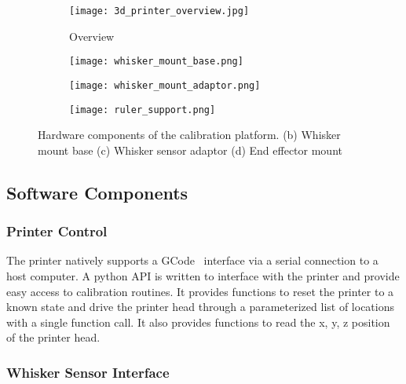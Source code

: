 \documentclass[runningheads]{llncs}
\begin{document}
\begin{figure}
    \begin{subfigure}{.245\columnwidth}
        \centering
        \texttt{[image: 3d\_printer\_overview.jpg]}
        \caption{Overview}
        \label{fig:calibration_rig_overview}
    \end{subfigure}
    \begin{subfigure}{.245\columnwidth}
    \centering
    \texttt{[image: whisker\_mount\_base.png]}
        \caption{}
        \label{fig:whisker_mount_base}
    \end{subfigure}
    \begin{subfigure}{.245\columnwidth}
        \centering
        \texttt{[image: whisker\_mount\_adaptor.png]}
        \caption{}
        \label{fig:whisker_mount_adaptor}
    \end{subfigure}
    \begin{subfigure}{.245\columnwidth}
        \centering
        \texttt{[image: ruler\_support.png]}
        \caption{}
        \label{fig:beam_monunt}
    \end{subfigure}
    \caption{Hardware components of the calibration platform. (b) Whisker mount base (c) Whisker sensor adaptor (d) End effector mount}
    \label{fig:calibration_rig}
\end{figure}

\subsection{Software Components}

\subsubsection{Printer Control}

The printer natively supports a GCode~\cite{kramerNISTRS274NGCInterpreter2000} interface via a serial connection to a host computer. A python API is written to interface with the printer and provide easy access to calibration routines. It provides functions to reset the printer to a known state and drive the printer head through a parameterized list of locations with a single function call. It also provides functions to read the x, y, z position of the printer head.

\subsubsection{Whisker Sensor Interface}
\end{document}
